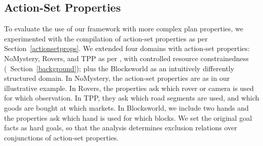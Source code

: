 %





\subsection{Action-Set Properties}
\label{experiments:asp}


To evaluate the use of our framework with more complex plan
properties, we experimented with the compilation of action-set
properties as per Section~\ref{actionsetprops}.
%
We extended four domains with action-set properties: NoMystery,
Rovers, and TPP as per \cite{nakhost:etal:icaps-12}, with controlled
resource constrainedness (\cf\ Section~\ref{background}); plus the
Blocksworld as an intuitively differently structured domain.
%
In NoMystery, the action-set properties are as in our illustrative
example. In Rovers, the properties ask which rover or camera is used
for which observation. In TPP, they ask which road segments are used,
and which goods are bought at which markets. In Blocksworld, we
include two hands and the properties ask which hand is used for which
blocks.
%
We set the original goal facts as hard goals, so that the analysis
determines exclusion relations over conjunctions of action-set
properties.

